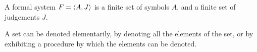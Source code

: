\begin{definition}

A formal system $F=\left\langle{A,J}\right\rangle$ is a finite set of symbols $A$, and a finite set
of judgements $J$.

\end{definition}


\begin{definition}



\end{definition}

\pagebreak

A set can be denoted elementarily, by denoting all the elements of the set, or
by exhibiting a procedure by which the elements can be denoted.


\pagebreak






